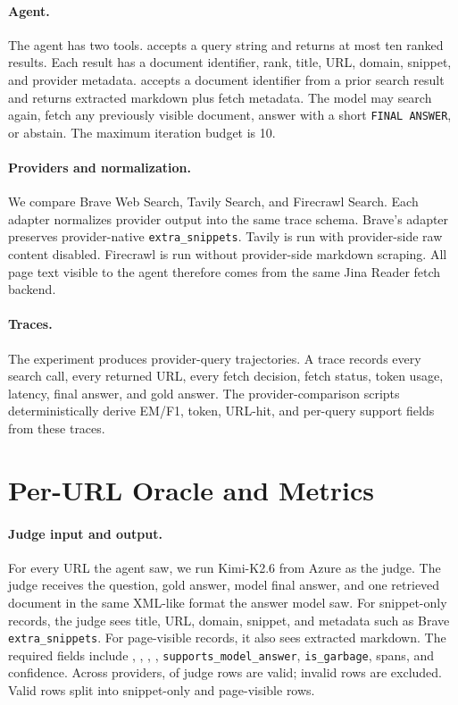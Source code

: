 \paragraph{Agent.}
The agent has two tools. \searchWeb{} accepts a query string and returns at most ten ranked results. Each result has a document identifier, rank, title, URL, domain, snippet, and provider metadata. \fetchPage{} accepts a document identifier from a prior search result and returns extracted markdown plus fetch metadata. The model may search again, fetch any previously visible document, answer with a short \texttt{FINAL ANSWER}, or abstain. The maximum iteration budget is 10.

\paragraph{Providers and normalization.}
We compare Brave Web Search, Tavily Search, and Firecrawl Search. Each adapter normalizes provider output into the same trace schema. Brave's adapter preserves provider-native \texttt{extra\_snippets}. Tavily is run with provider-side raw content disabled. Firecrawl is run without provider-side markdown scraping. All page text visible to the agent therefore comes from the same Jina Reader fetch backend.

\paragraph{Traces.}
The experiment produces \NTraces{} provider-query trajectories. A trace records every search call, every returned URL, every fetch decision, fetch status, token usage, latency, final answer, and gold answer. The provider-comparison scripts deterministically derive EM/F1, token, URL-hit, and per-query support fields from these traces.

\section{Per-URL Oracle and Metrics}
\label{sec:metrics}

\paragraph{Judge input and output.}
For every URL the agent saw, we run Kimi-K2.6 from Azure as the judge. The judge receives the question, gold answer, model final answer, and one retrieved document in the same XML-like format the answer model saw. For snippet-only records, the judge sees title, URL, domain, snippet, and metadata such as Brave \texttt{extra\_snippets}. For page-visible records, it also sees extracted markdown. The required fields include \containsGold{}, \goldSnip{}, \goldPage{}, \contraGold{}, \texttt{supports\_model\_answer}, \texttt{is\_garbage}, spans, and confidence. Across providers, \NJudgeValid{} of \NJudgeTotal{} judge rows are valid; \NJudgeInvalid{} invalid rows are excluded. Valid rows split into \NJudgeSnippetValid{} snippet-only and \NJudgePageValid{} page-visible rows.

